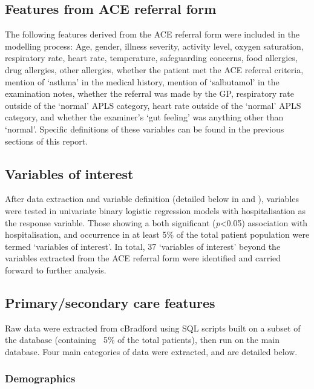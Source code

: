 \subsection{Features from ACE referral form}

The following features derived from the ACE referral form were included in the modelling process: Age, gender, illness severity, activity level, oxygen saturation, respiratory rate, heart rate, temperature, safeguarding concerns, food allergies, drug allergies, other allergies, whether the patient met the ACE referral criteria, mention of `asthma' in the medical history, mention of `salbutamol' in the examination notes, whether the referral was made by the GP, respiratory rate outside of the `normal' APLS category, heart rate outside of the `normal' APLS category, and whether the examiner's `gut feeling' was anything other than `normal'. Specific definitions of these variables can be found in the previous sections of this report.

\subsection{Variables of interest}

After data extraction and variable definition (detailed below in  and ), variables were tested in univariate binary logistic regression models with hospitalisation as the response variable. Those showing a both significant (\textit{p}<0.05) association with hospitalisation, and occurrence in at least 5\% of the total patient population were termed `variables of interest'. In total, 37 `variables of interest' beyond the variables extracted from the ACE referral form were identified and carried forward to further analysis.

\subsection{Primary/secondary care features}
\label{sec:PSC-features}

Raw data were extracted from cBradford using SQL scripts built on a subset of the database (containing ~5\% of the total patients), then run on the main database. Four main categories of data were extracted, and are detailed below. 

\subsubsection{Demographics}

